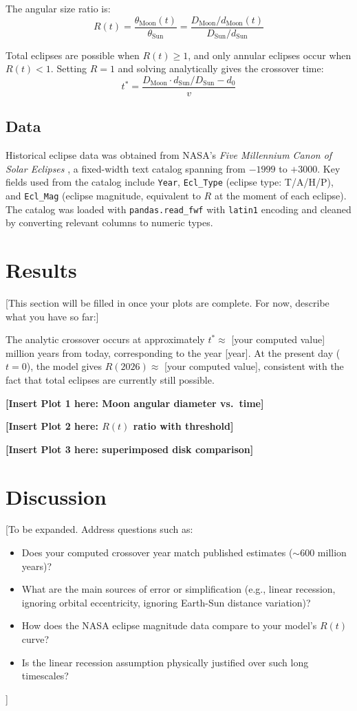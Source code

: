 \documentclass[11pt]{article}
\begin{document}
The angular size ratio is:
\[
    R(t) = \frac{\theta_\mathrm{Moon}(t)}{\theta_\mathrm{Sun}}
         = \frac{D_\mathrm{Moon} / d_\mathrm{Moon}(t)}{D_\mathrm{Sun} / d_\mathrm{Sun}}
\]

Total eclipses are possible when $R(t) \geq 1$, and only annular eclipses
occur when $R(t) < 1$.
Setting $R = 1$ and solving analytically gives the crossover time:
\[
    t^* = \frac{D_\mathrm{Moon} \cdot d_\mathrm{Sun} / D_\mathrm{Sun} - d_0}{v}
\]

\subsection*{Data}

Historical eclipse data was obtained from NASA's \textit{Five Millennium Canon of
Solar Eclipses} \cite{nasa_canon}, a fixed-width text catalog spanning from
$-1999$ to $+3000$.
Key fields used from the catalog include \texttt{Year}, \texttt{Ecl\_Type}
(eclipse type: T/A/H/P), and \texttt{Ecl\_Mag} (eclipse magnitude,
equivalent to $R$ at the moment of each eclipse).
The catalog was loaded with \texttt{pandas.read\_fwf} with \texttt{latin1}
encoding and cleaned by converting relevant columns to numeric types.

\section*{Results}

[This section will be filled in once your plots are complete.
For now, describe what you have so far:]

The analytic crossover occurs at approximately $t^* \approx$ [your computed value]
million years from today, corresponding to the year [year].
At the present day ($t = 0$), the model gives $R(2026) \approx$ [your computed value],
consistent with the fact that total eclipses are currently still possible.

\textbf{[Insert Plot 1 here: Moon angular diameter vs.\ time]}

\textbf{[Insert Plot 2 here: $R(t)$ ratio with threshold]}

\textbf{[Insert Plot 3 here: superimposed disk comparison]}

\section*{Discussion}

[To be expanded. Address questions such as:
\begin{itemize}
    \item Does your computed crossover year match published estimates
          ($\sim$600 million years)?
    \item What are the main sources of error or simplification
          (e.g., linear recession, ignoring orbital eccentricity,
          ignoring Earth-Sun distance variation)?
    \item How does the NASA eclipse magnitude data compare to your model's
          $R(t)$ curve?
    \item Is the linear recession assumption physically justified over
          such long timescales?
\end{itemize}]
\end{document}
